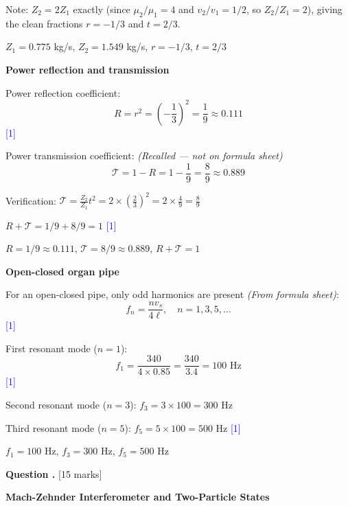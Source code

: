 \documentclass[12pt,a4paper]{article}
\newcounter{questioncounter}
\newcommand{\question}[1]{%
  \stepcounter{questioncounter}%
  \vspace{0.5cm}%
  \noindent\textbf{Question \thequestioncounter.} \hfill [#1 marks]%
  \vspace{0.2cm}%
  \par%
}
\newcommand{\markstep}[1]{\hfill\textcolor{blue}{[#1]}}
\newcommand{\finalanswer}[1]{%
  \begin{tcolorbox}[colback=green!5!white,colframe=green!50!black,boxrule=0.5pt]
  #1
  \end{tcolorbox}
}
\newcommand{\fromsheet}{\textit{(From formula sheet)}}
\newcommand{\recalled}{\textit{(Recalled --- not on formula sheet)}}
\begin{document}
\begin{parts}
Note: $Z_2 = 2Z_1$ exactly (since $\mu_2/\mu_1 = 4$ and $v_2/v_1 = 1/2$, so $Z_2/Z_1 = 2$), giving the clean fractions $r = -1/3$ and $t = 2/3$.

\finalanswer{$Z_1 = 0.775$ kg/s, $Z_2 = 1.549$ kg/s, $r = -1/3$, $t = 2/3$}

\item \textbf{Power reflection and transmission} 

Power reflection coefficient:
\[
R = r^2 = \left(-\frac{1}{3}\right)^2 = \frac{1}{9} \approx 0.111
\]
\markstep{1}

Power transmission coefficient: \recalled
\[
\mathcal{T} = 1 - R = 1 - \frac{1}{9} = \frac{8}{9} \approx 0.889
\]

Verification: $\mathcal{T} = \frac{Z_2}{Z_1}t^2 = 2 \times \left(\frac{2}{3}\right)^2 = 2 \times \frac{4}{9} = \frac{8}{9}$ \checkmark

$R + \mathcal{T} = 1/9 + 8/9 = 1$ \checkmark \markstep{1}

\finalanswer{$R = 1/9 \approx 0.111$, $\mathcal{T} = 8/9 \approx 0.889$, $R + \mathcal{T} = 1$}

\item \textbf{Open-closed organ pipe} 

For an open-closed pipe, only odd harmonics are present \fromsheet:
\[
f_n = \frac{nv_s}{4\ell}, \quad n = 1, 3, 5, \ldots
\]
\markstep{1}

First resonant mode ($n = 1$):
\[
f_1 = \frac{340}{4 \times 0.85} = \frac{340}{3.4} = 100 \text{ Hz}
\]
\markstep{1}

Second resonant mode ($n = 3$): $f_3 = 3 \times 100 = 300$ Hz

Third resonant mode ($n = 5$): $f_5 = 5 \times 100 = 500$ Hz \markstep{1}

\finalanswer{$f_1 = 100$ Hz, $f_3 = 300$ Hz, $f_5 = 500$ Hz}

\end{parts}

\newpage

\question{15}

\noindent\textbf{Mach-Zehnder Interferometer and Two-Particle States}
\end{document}
